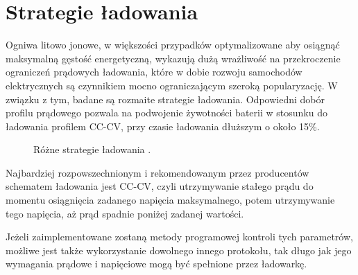 \documentclass[polish,engineer]{polsl-msth}
\begin{document}
\section{Strategie ładowania}
Ogniwa litowo jonowe, w większości przypadków optymalizowane aby osiągnąć maksymalną gęstość energetyczną, wykazują dużą wrażliwość na przekroczenie ograniczeń prądowych ładowania\cite{TOMASZEWSKA2019100011}, które w dobie rozwoju samochodów elektrycznych są czynnikiem mocno ograniczającym szeroką popularyzację. W związku z tym, badane są rozmaite strategie ładowania. Odpowiedni dobór profilu prądowego pozwala na podwojenie żywotności baterii w stosunku do ładowania profilem CC-CV, przy czasie ładowania dłuższym o około 15\%\cite{SCHINDLER2018364}.
\begin{figure}[hbtp]
     \caption{Różne strategie ładowania \cite{TOMASZEWSKA2019100011}.\label{img:charging_protocols}}
\end{figure}

Najbardziej rozpowszechnionym i rekomendowanym przez producentów schematem ładowania jest CC-CV, czyli utrzymywanie stałego prądu do momentu osiągnięcia zadanego napięcia maksymalnego, potem utrzymywanie tego napięcia, aż prąd spadnie poniżej zadanej wartości.

Jeżeli zaimplementowane zostaną metody programowej kontroli tych parametrów, możliwe jest także wykorzystanie dowolnego innego protokołu, tak długo jak jego wymagania prądowe i napięciowe mogą być spełnione przez ładowarkę.
\end{document}
